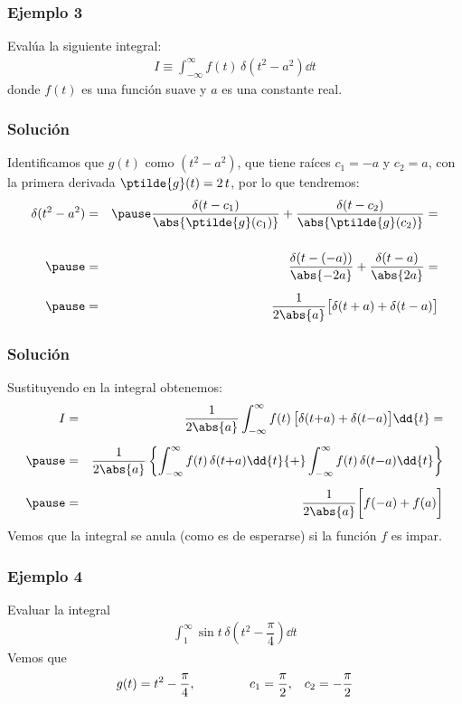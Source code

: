 \begin{frame}
\frametitle{Ejemplo 3}
Evalúa la siguiente integral:
\begin{align*}
I \equiv \int_{-\infty}^{\infty} f(t) \, \delta(t^{2} - a^{2}) \dd{t}
\end{align*}
donde $f(t)$ es una función suave y $a$ es una constante real.
\end{frame}
\begin{frame}
\frametitle{Solución}
Identificamos que $g(t)$ como $(t^{2} - a^{2})$, \pause que tiene raíces $c_{1} = -a$ y $c_{2} = a$, con la primera derivada $\ptilde{g}(t) = 2 \, t$, por lo que tendremos:
\pause
\begin{eqnarray*}
\delta(t^{2} - a^{2}) &=& \pause \dfrac{\delta (t - c_{1})}{\abs{\ptilde{g}(c_{1})}} + \dfrac{\delta (t - c_{2})}{\abs{\ptilde{g}(c_{2})}} = \\[0.5cm] \pause
&=& \dfrac{\delta (t - (-a))}{\abs{-2a}} + \dfrac{\delta (t - a)}{\abs{2a}} = \\[0.5em] \pause
&=& \dfrac{1}{2 \abs{a}} \big[ \delta(t + a) + \delta(t - a) \big]
\end{eqnarray*}
\end{frame}
\begin{frame}
\frametitle{Solución}
Sustituyendo en la integral obtenemos:
\begin{eqnarray*}
I &=& \dfrac{1}{2 \abs{a}} \int_{-\infty}^{\infty} f(t) \, \big[ \delta(t {+} a) + \delta(t {-} a) \big] \dd{t} = \\[0.5em] \pause
&=& \dfrac{1}{2 \abs{a}} \left\{ \int_{-\infty}^{\infty} f(t) \, \delta(t {+} a) \dd{t} {+} \int_{-\infty}^{\infty} f(t) \, \delta(t {-} a) \dd{t} \right\} \\[0.5em] \pause
&=& \dfrac{1}{2 \abs{a}} \bigg[ f(-a) + f(a) \bigg]
\end{eqnarray*}
\pause
Vemos que la integral se anula (como es de esperarse) si la función $f$ es impar.
\end{frame}
\begin{frame}
\frametitle{Ejemplo 4}
Evaluar la integral
\begin{align*}
\int_{1}^{\infty} \sin t \, \delta \left( t^{2} - \dfrac{\pi}{4} \right) \dd{t}
\end{align*}
\pause
Vemos que
\begin{align*}
g(t) = t^{2} - \dfrac{\pi}{4}, \hspace{1.5cm} c_{1} = \dfrac{\pi}{2}, \hspace{0.3cm} c_{2} = - \dfrac{\pi}{2}
\end{align*}
\end{frame}
